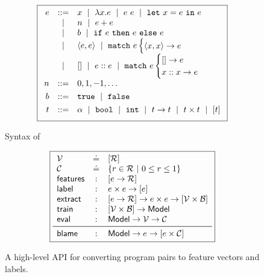 \begin{figure}[t]
\centering
\[
\boxed{
\begin{array}{rcl}
e & ::=    & x \spmid \efun{x}{e} \spmid \eapp{e}{e} \spmid \elet{x}{e}{e} \\
  & \spmid & n \spmid \eplus{e}{e}\\
  & \spmid & b \spmid \eif{e}{e}{e} \\
  & \spmid & \epair{e}{e} \spmid \epcase{e}{x}{x}{e} \\
  & \spmid & \enil \spmid \econs{e}{e} \spmid \elcase{e}{e}{x}{x}{e} \\[0.05in]

n & ::= &  0, 1, -1, \ldots \\[0.05in]

b & ::= &  \etrue \spmid \efalse \\[0.05in]

t & ::= & \alpha \spmid \tbool \spmid \tint \spmid \tarr{t}{t} \spmid \tprod{t}{t} \spmid \tlist{t} \\[0.05in]
\end{array}
}
\]
\caption{Syntax of \lang}
\label{fig:syntax}
\end{figure}
\lstDeleteShortInline{|} %
\begin{figure}[t]
\[
\boxed{
\begin{array}{lcl}
  \V          & \defeq & \List{\R}\\
  \Runit      & \defeq & \{r \in \R\ |\ 0 \le r \le 1\} \\ %
  \featuresym & : & \List{e \to \R} \\
  \labelsym   & : & e \times e \to \List{e} \\
  \extractsym & : & \List{e \to \R} \to e \times e \to \List{\V \times \B} \\
  \trainsym   & : & \List{\V \times \B} \to \Model \\
  \evalsym    & : & \Model \to \V \to \Runit \\
  \midrule
  \blamesym   & : & \Model \to e \to \List{e \times \Runit}
\end{array}
}
\]
\caption{
  A high-level API for converting program pairs to
  feature vectors and labels.
}
\label{fig:api}
\end{figure}
\lstMakeShortInline{|}
